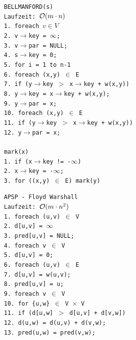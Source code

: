 \documentclass[fs, footer]{latex4ei}
\renewcommand{\t}{\texttt}
\begin{document}
\begin{multicols*}{4}
{{	\parbox{3.6cm}{
	\t{BELLMANFORD(s) \\
	Laufzeit: $\operatorname{\mathcal O}(m\cdot n)$\\
	1.	foreach $v \in V$\\
	2.	\quad	v$\rightarrow$key = $\infty$;\\
	3.	\quad	v$\rightarrow$par = NULL;\\
	4.	s$\rightarrow$key = 0;\\
	5.	for i = 1 to n-1\\
	6.	\quad	foreach (x,y) $\in$ E\\
	7.	\quad \quad		if (y$\rightarrow$key $>$ x$\rightarrow$key + w(x,y))\\
	8.	\quad \quad \quad			y$\rightarrow$key = x$\rightarrow$key + w(x,y);\\
	9.	\quad \quad \quad			y$\rightarrow$par = x;\\
	10.	foreach (x,y) $\in$ E\\
	11.	\quad	if (y$\rightarrow$key $>$ x$\rightarrow$key + w(x,y))\\
	12.	\quad \quad		y$\rightarrow$par = x;\\
	\ \\
	mark(x)\\
	1.	if (x$\rightarrow$key != -$\infty$)\\
	2.	\quad	x$\rightarrow$key = -$\infty$;\\
	3.	\quad	for ((x,y) $\in$ E) mark(y)\\
	}}\hspace{-.2cm}
	\parbox{3.5cm}{
	\t{APSP - Floyd Warshall \\
	Laufzeit: $\operatorname{\mathcal O}(m\cdot n^2)$\\
	1.	foreach (u,v) $\in$ V\\
	2. \quad	d[u,v] = $\infty$\\
	3. \quad	pred[u,v] = NULL;\\
	4.	foreach v $\in$ V\\
	5. \quad	d[u,v] = 0;\\
	6.	foreach (u,v) $\in$ E\\
	7. \quad	d[u,v] = w(u,v);\\
	8. \quad	pred[u,v] = u;\\
	9.	foreach v $\in$ V\\
	10. \quad	for \{u,w\} $\in$ V $\times$ V\\
	11. \quad \quad	if (d[u,w] $>$ d[u,v] + d[v,w])\\
	12.	\quad \quad \quad	d(u,w) = d(u,v) + d(v,w);\\
	13. \quad \quad \quad	pred(u,w) = pred(v,w);\\
	}}

}}
\end{multicols*}
\end{document}
